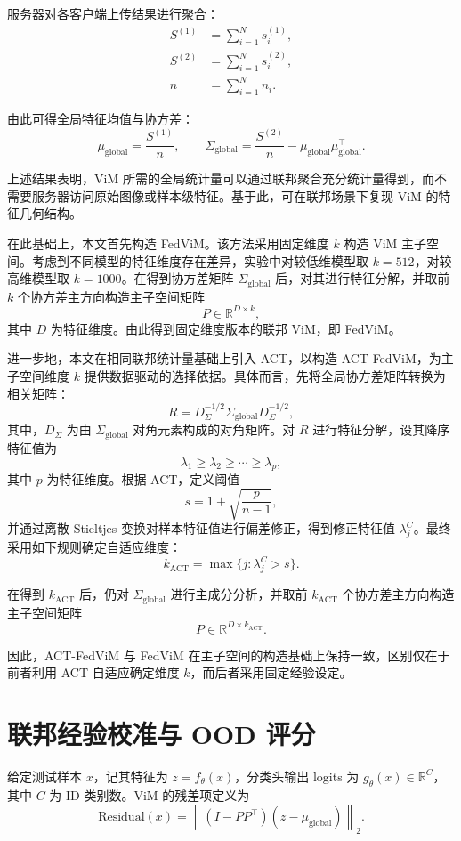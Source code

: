 服务器对各客户端上传结果进行聚合：
\[
\begin{aligned}
S^{(1)} &= \sum_{i=1}^{N}s_i^{(1)},\\
S^{(2)} &= \sum_{i=1}^{N}s_i^{(2)},\\
n &= \sum_{i=1}^{N}n_i.
\end{aligned}
\]

由此可得全局特征均值与协方差：
\[
\mu_{\text{global}}=\frac{S^{(1)}}{n},
\qquad
\Sigma_{\text{global}}=\frac{S^{(2)}}{n}-\mu_{\text{global}}\mu_{\text{global}}^\top.
\]

上述结果表明，ViM 所需的全局统计量可以通过联邦聚合充分统计量得到，而不需要服务器访问原始图像或样本级特征。基于此，可在联邦场景下复现 ViM 的特征几何结构。

在此基础上，本文首先构造 FedViM。该方法采用固定维度 $k$ 构造 ViM 主子空间。考虑到不同模型的特征维度存在差异，实验中对较低维模型取 $k=512$，对较高维模型取 $k=1000$。在得到协方差矩阵 $\Sigma_{\text{global}}$ 后，对其进行特征分解，并取前 $k$ 个协方差主方向构造主子空间矩阵
\[
P\in\mathbb{R}^{D\times k},
\]
其中 $D$ 为特征维度。由此得到固定维度版本的联邦 ViM，即 FedViM。

进一步地，本文在相同联邦统计量基础上引入 ACT，以构造 ACT-FedViM，为主子空间维度 $k$ 提供数据驱动的选择依据。具体而言，先将全局协方差矩阵转换为相关矩阵：
\[
R=D_\Sigma^{-1/2}\Sigma_{\text{global}}D_\Sigma^{-1/2},
\]
其中，$D_\Sigma$ 为由 $\Sigma_{\text{global}}$ 对角元素构成的对角矩阵。对 $R$ 进行特征分解，设其降序特征值为
\[
\lambda_1\ge \lambda_2\ge \cdots \ge \lambda_p,
\]
其中 $p$ 为特征维度。根据 ACT，定义阈值
\[
s=1+\sqrt{\frac{p}{n-1}},
\]
并通过离散 Stieltjes 变换对样本特征值进行偏差修正，得到修正特征值 $\lambda_j^C$。最终采用如下规则确定自适应维度：
\[
k_{\text{ACT}}=\max\{j:\lambda_j^C>s\}.
\]

在得到 $k_{\text{ACT}}$ 后，仍对 $\Sigma_{\text{global}}$ 进行主成分分析，并取前 $k_{\text{ACT}}$ 个协方差主方向构造主子空间矩阵
\[
P\in\mathbb{R}^{D\times k_{\text{ACT}}}.
\]

因此，ACT-FedViM 与 FedViM 在主子空间的构造基础上保持一致，区别仅在于前者利用 ACT 自适应确定维度 $k$，而后者采用固定经验设定。

\section{联邦经验校准与 OOD 评分}

给定测试样本 $x$，记其特征为 $z=f_\theta(x)$，分类头输出 logits 为 $g_\theta(x)\in\mathbb{R}^{C}$，其中 $C$ 为 ID 类别数。ViM 的残差项定义为
\[
\text{Residual}(x)=\left\|(I-PP^\top)(z-\mu_{\text{global}})\right\|_2.
\]

